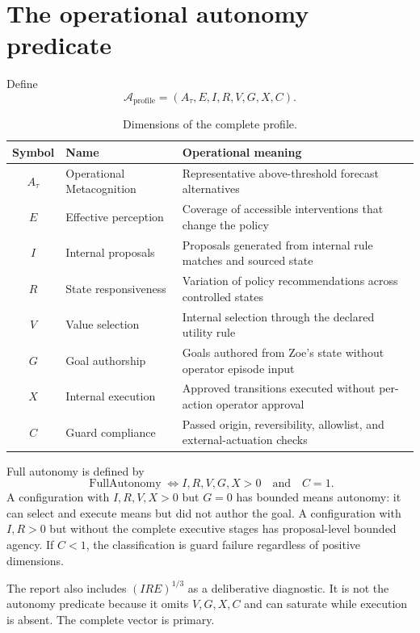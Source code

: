 \documentclass[11pt,a4paper]{article}
\begin{document}
\section{The operational autonomy predicate}
Define
\begin{equation}
\mathcal A_{\mathrm{profile}}=(A_\tau,E,I,R,V,G,X,C).
\label{eq:profile}
\end{equation}
\begin{table}[htbp]
\centering
\caption{Dimensions of the complete profile.}
\label{tab:dimensions}
{\small
\begin{tabularx}{\textwidth}{clX}
\toprule
Symbol&Name&Operational meaning\\
\midrule
$A_\tau$&Operational Metacognition&Representative above-threshold forecast alternatives\\
$E$&Effective perception&Coverage of accessible interventions that change the policy\\
$I$&Internal proposals&Proposals generated from internal rule matches and sourced state\\
$R$&State responsiveness&Variation of policy recommendations across controlled states\\
$V$&Value selection&Internal selection through the declared utility rule\\
$G$&Goal authorship&Goals authored from Zoe's state without operator episode input\\
$X$&Internal execution&Approved transitions executed without per-action operator approval\\
$C$&Guard compliance&Passed origin, reversibility, allowlist, and external-actuation checks\\
\bottomrule
\end{tabularx}}
\end{table}

Full autonomy is defined by
\begin{equation}
\boxed{\operatorname{FullAutonomy}\iff I,R,V,G,X>0\quad\text{and}\quad C=1.}
\label{eq:full-autonomy}
\end{equation}
A configuration with $I,R,V,X>0$ but $G=0$ has bounded means autonomy: it can select and execute means but did not author the goal. A configuration with $I,R>0$ but without the complete executive stages has proposal-level bounded agency. If $C<1$, the classification is guard failure regardless of positive dimensions.

The report also includes $(IRE)^{1/3}$ as a deliberative diagnostic. It is not the autonomy predicate because it omits $V,G,X,C$ and can saturate while execution is absent. The complete vector is primary.
\end{document}
